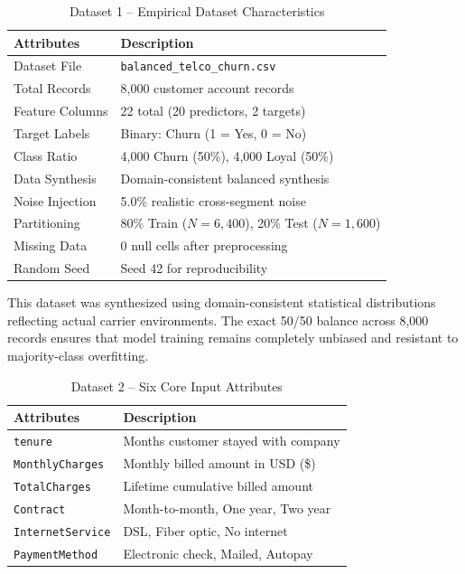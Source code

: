 \documentclass[conference]{IEEEtran}
\begin{document}
\begin{table}[htbp]
\caption{Dataset 1 -- Empirical Dataset Characteristics}
\begin{center}
\begin{tabular}{ll}
\toprule
\textbf{Attributes} & \textbf{Description} \\
\midrule
Dataset File & \texttt{balanced\_telco\_churn.csv} \\
Total Records & 8,000 customer account records \\
Feature Columns & 22 total (20 predictors, 2 targets) \\
Target Labels & Binary: Churn (1 = Yes, 0 = No) \\
Class Ratio & 4,000 Churn (50\%), 4,000 Loyal (50\%) \\
Data Synthesis & Domain-consistent balanced synthesis \\
Noise Injection & 5.0\% realistic cross-segment noise \\
Partitioning & 80\% Train ($N=6,400$), 20\% Test ($N=1,600$) \\
Missing Data & 0 null cells after preprocessing \\
Random Seed & Seed 42 for reproducibility \\
\bottomrule
\end{tabular}
\label{tab1}
\end{center}
\end{table}

This dataset was synthesized using domain-consistent statistical distributions reflecting actual carrier environments. The exact 50/50 balance across 8,000 records ensures that model training remains completely unbiased and resistant to majority-class overfitting.

\begin{table}[htbp]
\caption{Dataset 2 -- Six Core Input Attributes}
\begin{center}
\begin{tabular}{ll}
\toprule
\textbf{Attributes} & \textbf{Description} \\
\midrule
\texttt{tenure} & Months customer stayed with company \\
\texttt{MonthlyCharges} & Monthly billed amount in USD (\$) \\
\texttt{TotalCharges} & Lifetime cumulative billed amount \\
\texttt{Contract} & Month-to-month, One year, Two year \\
\texttt{InternetService} & DSL, Fiber optic, No internet \\
\texttt{PaymentMethod} & Electronic check, Mailed, Autopay \\
\bottomrule
\end{tabular}
\label{tab2}
\end{center}
\end{table}
\end{document}
